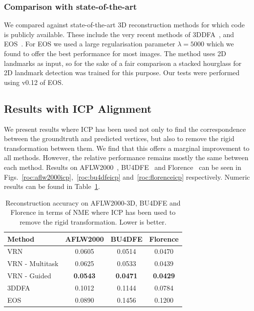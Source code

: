 \subsubsection{Comparison with state-of-the-art}
We compared against state-of-the-art 3D reconstruction methods for
which code is publicly available. These include the very recent
methods of 3DDFA~\cite{zhu2016face}, and
EOS~\cite{huber2016multiresolution}. For EOS we used a large
regularisation parameter $\lambda = 5000$ which we found to offer the
best performance for most images. The method uses 2D landmarks as
input, so for the sake of a fair comparison a stacked hourglass for 2D
landmark detection was trained for this purpose. Our tests were
performed using v0.12 of EOS.


\subsection{Results with ICP Alignment}
\label{sec:faceicpres}

We present results where ICP has been used not only to find the
correspondence between the groundtruth and predicted vertices, but
also to remove the rigid transformation between them. We find that
this offers a marginal improvement to all methods. However, the
relative performance remains mostly the same between each
method. Results on AFLW2000~\cite{zhu2016face},
BU4DFE~\cite{yin2008high} and Florence~\cite{masi2d3dFaceData} can be
seen in Figs.~\ref{roc:aflw2000icp},~\ref{roc:bu4dfeicp}
and~\ref{roc:florenceicp} respectively. Numeric results can be found
in Table~\ref{tab:overviewicp}.

\begin{table}
  \caption[Numerical performance of 3D face reconstruction with
  ICP]{Reconstruction accuracy on AFLW2000-3D, BU4DFE and Florence in
    terms of NME where ICP has been used to remove the rigid
    transformation. Lower is better. }
  \label{tab:overviewicp}
  \centering\vspace{1mm}
  \small
\begin{tabular}{|l||c|c|c|}
  \hline
  \textbf{Method}   & \textbf{AFLW2000} & \textbf{BU4DFE} & \textbf{Florence} \\
  \hline\hline
  VRN               & 0.0605 & 0.0514 & 0.0470   \\
  VRN - Multitask   &   0.0625    & 0.0533     & 0.0439        \\
  VRN - Guided      & \textbf{0.0543} & \textbf{0.0471} & \textbf{0.0429}   \\

\hline
  3DDFA~\cite{zhu2016face}             & 0.1012 & 0.1144 & 0.0784   \\
  EOS~\cite{huber2016multiresolution}  & 0.0890 & 0.1456 & 0.1200   \\
  \hline
\end{tabular}
\end{table}

